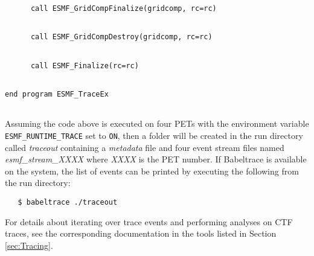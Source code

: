 
 \begin{verbatim}
      call ESMF_GridCompFinalize(gridcomp, rc=rc)
 
\end{verbatim}
 

 \begin{verbatim}
      call ESMF_GridCompDestroy(gridcomp, rc=rc)
 
\end{verbatim}
 

 \begin{verbatim}
      call ESMF_Finalize(rc=rc)
 
\end{verbatim}
 

 \begin{verbatim}
end program ESMF_TraceEx
 
\end{verbatim}
 

   Assuming the code above is executed on four PETs with
   the environment variable {\tt ESMF\_RUNTIME\_TRACE} set to
   {\tt ON}, then a folder will be created in the run directory
   called {\em traceout} containing a {\em metadata} file and
   four event stream files named {\em esmf\_stream\_XXXX}
   where {\em XXXX} is the PET number.  If Babeltrace is
   available on the system, the list of events can be printed
   by executing the following from the run directory:
   \begin{verbatim}
   $ babeltrace ./traceout
   \end{verbatim}
   For details about iterating over trace events and performing
   analyses on CTF traces, see the corresponding documentation
   in the tools listed in Section \ref{sec:Tracing}.
\setlength{\parskip}{\oldparskip}
\setlength{\parindent}{\oldparindent}
\setlength{\baselineskip}{\oldbaselineskip}
